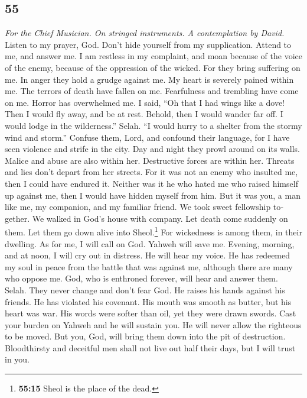 \begin{paracol}{2}
\switchcolumn
\begin{otherlanguage}{english}

\hypertarget{section-109}{%
\section{55}\label{section-109}}

\emph{For the Chief Musician. On stringed instruments. A contemplation
by David.}\\
 Listen to my prayer, God. Don't hide yourself from my
supplication.  Attend to me, and answer me. I am restless
in my complaint, and moan  because of the voice of the
enemy, because of the oppression of the wicked. For they bring suffering
on me. In anger they hold a grudge against me.  My heart
is severely pained within me. The terrors of death have fallen on me.
 Fearfulness and trembling have come on me. Horror has
overwhelmed me.  I said, ``Oh that I had wings like a
dove! Then I would fly away, and be at rest.  Behold, then
I would wander far off. I would lodge in the wilderness.'' Selah.
 ``I would hurry to a shelter from the stormy wind and
storm.''  Confuse them, Lord, and confound their language,
for I have seen violence and strife in the city.  Day and
night they prowl around on its walls. Malice and abuse are also within
her.  Destructive forces are within her. Threats and lies
don't depart from her streets.  For it was not an enemy
who insulted me, then I could have endured it. Neither was it he who
hated me who raised himself up against me, then I would have hidden
myself from him.  But it was you, a man like me, my
companion, and my familiar friend.  We took sweet
fellowship together. We walked in God's house with company.
 Let death come suddenly on them. Let them go down alive
into Sheol.\footnote{\textbf{55:15} Sheol is the place of the dead.} For
wickedness is among them, in their dwelling.  As for me,
I will call on God. Yahweh will save me.  Evening,
morning, and at noon, I will cry out in distress. He will hear my voice.
 He has redeemed my soul in peace from the battle that
was against me, although there are many who oppose me. 
God, who is enthroned forever, will hear and answer them. Selah. They
never change and don't fear God.  He raises his hands
against his friends. He has violated his covenant.  His
mouth was smooth as butter, but his heart was war. His words were softer
than oil, yet they were drawn swords.  Cast your burden
on Yahweh and he will sustain you. He will never allow the righteous to
be moved.  But you, God, will bring them down into the
pit of destruction. Bloodthirsty and deceitful men shall not live out
half their days, but I will trust in you.


\end{otherlanguage}
\end{paracol}
